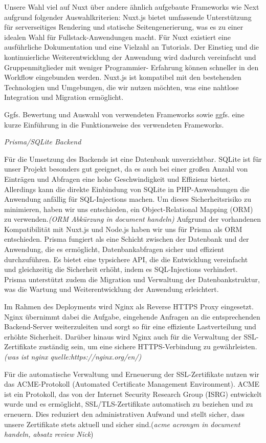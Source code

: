 \documentclass[a4paper,12pt]{article}
\begin{document}
Unsere Wahl viel auf Nuxt über andere ähnlich aufgebaute Frameworks wie Next aufgrund folgender Auswahlkriterien: 
Nuxt.js bietet umfassende Unterstützung für serverseitiges Rendering und statische Seitengenerierung, was es zu einer idealen Wahl für Fullstack-Anwendungen macht.
Für Nuxt existiert eine ausführliche Dokumentation und eine Vielzahl an Tutorials. Der Einstieg und die kontinuierliche Weiterentwicklung der Anwendung wird dadurch vereinfacht und Gruppenmitglieder mit weniger Programmier- Erfahrung können schneller in den Workflow eingebunden werden. 
Nuxt.js ist kompatibel mit den bestehenden Technologien und Umgebungen, die wir nutzen möchten, was eine nahtlose Integration und Migration ermöglicht. 

Ggfs. Bewertung und Auswahl von verwendeten Frameworks sowie ggfs. eine kurze
Einführung in die Funktionsweise des verwendeten Frameworks.

\textit{Prisma/SQLite Backend }

Für die Umsetzung des Backends ist eine Datenbank unverzichtbar. SQLite ist für unser Projekt besonders gut geeignet, da es auch bei einer großen Anzahl von Einträgen und Abfragen eine hohe Geschwindigkeit und Effizienz bietet. Allerdings kann die direkte Einbindung von SQLite in PHP-Anwendungen die Anwendung anfällig für SQL-Injections machen. Um dieses Sicherheitsrisiko zu minimieren, haben wir uns entschieden, ein Object-Relational Mapping (ORM) zu verwenden.\textit{(ORM Abkürzung in document handeln)}
Aufgrund der vorhandenen Kompatibilität mit Nuxt.js und Node.js haben wir uns für Prisma als ORM entschieden. Prisma fungiert als eine Schicht zwischen der Datenbank und der Anwendung, die es ermöglicht, Datenbankabfragen sicher und effizient durchzuführen. Es bietet eine typsichere API, die die Entwicklung vereinfacht und gleichzeitig die Sicherheit erhöht, indem es SQL-Injections verhindert. Prisma unterstützt zudem die Migration und Verwaltung der Datenbankstruktur, was die Wartung und Weiterentwicklung der Anwendung erleichtert.

Im Rahmen des Deployments wird Nginx als Reverse HTTPS Proxy eingesetzt. Nginx übernimmt dabei die Aufgabe, eingehende Anfragen an die entsprechenden Backend-Server weiterzuleiten und sorgt so für eine effiziente Lastverteilung und erhöhte Sicherheit. Darüber hinaus wird Nginx auch für die Verwaltung der SSL-Zertifikate zuständig sein, um eine sichere HTTPS-Verbindung zu gewährleisten.\textit{(was ist nginx quelle:https://nginx.org/en/)}

Für die automatische Verwaltung und Erneuerung der SSL-Zertifikate nutzen wir das ACME-Protokoll (Automated Certificate Management Environment). ACME ist ein Protokoll, das von der Internet Security Research Group (ISRG) entwickelt wurde und es ermöglicht, SSL/TLS-Zertifikate automatisch zu beziehen und zu erneuern. Dies reduziert den administrativen Aufwand und stellt sicher, dass unsere Zertifikate stets aktuell und sicher sind.(\textit{acme acronym in document handeln, absatz review Nick})
\end{document}

